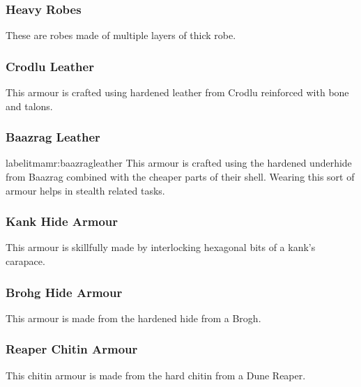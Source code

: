 \begin{multicols}{2}

\subsubsection{Heavy Robes}
\label{itmamr:heavyrobes}
These are robes made of multiple layers of thick robe.


\subsubsection{Crodlu Leather}
\label{itmamr:crodluleather}
This armour is crafted using hardened leather from Crodlu reinforced with bone and talons.

\subsubsection{Baazrag Leather}
label{itmamr:baazragleather}
This armour is crafted using the hardened underhide from Baazrag combined with the cheaper parts of their shell. 
Wearing this sort of armour helps in stealth related tasks.

\subsubsection{Kank Hide Armour}
\label{itmamr:kankhide}
This armour is skillfully made by interlocking hexagonal bits of a kank’s carapace.

\subsubsection{Brohg Hide Armour}
\label{itmamr:brohghide}
This armour is made from the hardened hide from a Brogh.

\subsubsection{Reaper Chitin Armour}
\label{itmamr:reaperchitin}
This chitin armour is made from the hard chitin from a Dune Reaper.



\end{multicols}
